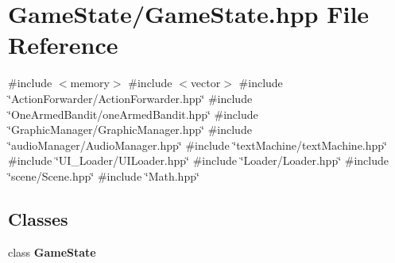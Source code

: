 \section{Game\+State/\+Game\+State.hpp File Reference}
\label{_game_state_8hpp}
{\ttfamily \#include $<$memory$>$}\newline
{\ttfamily \#include $<$vector$>$}\newline
{\ttfamily \#include \char`\"{}Action\+Forwarder/\+Action\+Forwarder.\+hpp\char`\"{}}\newline
{\ttfamily \#include \char`\"{}One\+Armed\+Bandit/one\+Armed\+Bandit.\+hpp\char`\"{}}\newline
{\ttfamily \#include \char`\"{}Graphic\+Manager/\+Graphic\+Manager.\+hpp\char`\"{}}\newline
{\ttfamily \#include \char`\"{}audio\+Manager/\+Audio\+Manager.\+hpp\char`\"{}}\newline
{\ttfamily \#include \char`\"{}text\+Machine/text\+Machine.\+hpp\char`\"{}}\newline
{\ttfamily \#include \char`\"{}U\+I\+\_\+\+Loader/\+U\+I\+Loader.\+hpp\char`\"{}}\newline
{\ttfamily \#include \char`\"{}Loader/\+Loader.\+hpp\char`\"{}}\newline
{\ttfamily \#include \char`\"{}scene/\+Scene.\+hpp\char`\"{}}\newline
{\ttfamily \#include \char`\"{}Math.\+hpp\char`\"{}}\newline
\subsection*{Classes}
\begin{DoxyCompactItemize}
\item 
class \textbf{ Game\+State}
\end{DoxyCompactItemize}
